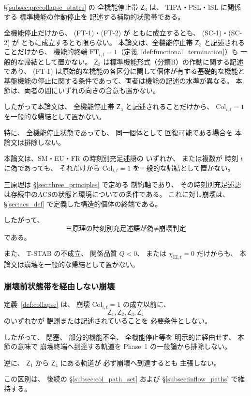 \begin{remark}[全機能停止と崩壊の区別]
\label{rem:full_stop_not_collapse}
\S\ref{subsec:precollapse_states} の
全機能停止帯
$\mathsf{Z}_3$
は、
TIPA・PSL・ISL に関係する
標準機能の作動停止を
記述する補助的状態帯である。

全機能停止だけから、
(FT-1)・(FT-2) が
ともに成立するとも、
(SC-1)・(SC-2) が
ともに成立するとも限らない。
本論文は、全機能停止帯 $\mathsf{Z}_3$ と記述されることだけから、
機能的終端 $\mathrm{FT}_{i,t}=1$（定義~\ref{def:functional_termination}）も
一般的な帰結として置かない。
$\mathsf{Z}_3$ は標準機能形式（分類B）の作動に関する記述であり、
(FT-1) は原始的な機能の各区分に関して個体が有する基礎的な機能と
基盤機能の停止に関する条件であって、両者は機能の記述の水準が異なる。
本節は、両者の間にいずれの向きの含意も置かない。

したがって本論文は、
全機能停止帯 $\mathsf{Z}_3$ と記述されることだけから、
$\mathrm{Col}_{i,t}=1$ を一般的な帰結として置かない。

特に、
全機能停止状態であっても、
同一個体として
回復可能である場合を
本論文は排除しない。
\end{remark}

\begin{remark}[三原理の時刻別充足述語が偽であることと崩壊の関係]
\label{rem:principle_failure_not_collapse}
本論文は、SM・EU・FR の時刻別充足述語の
いずれか、
または複数が
時刻 $t$ に偽であっても、
それだけから
$\mathrm{Col}_{i,t}=1$
を一般的な帰結として置かない。

三原理は
\S\ref{sec:three_principles} で定める
制約軸であり、
その時刻別充足述語は存続中のACSの状態と環境についての条件である。
これに対し崩壊は、
\S\ref{sec:acs_def} で定義した構造的個体の終端である。

したがって、
\[
  \text{三原理の時刻別充足述語が偽}
  \neq
  \text{崩壊判定}
\]
である。

また、
T-STAB の不成立、
関係品質 $Q<0$、
または
$\chi_{\mathrm{EI},t}=0$
だけからも、
本論文は崩壊を一般的な帰結として置かない。
\end{remark}

\subsubsection{崩壊前状態帯を経由しない崩壊}

\begin{remark}[崩壊前状態帯の事前経由を必要条件としない]
\label{rem:collapse_without_precollapse}
定義~\ref{def:collapse} は、
崩壊
$\mathrm{Col}_{i,t}=1$
の成立以前に、
\[
  \mathsf{Z}_1,
  \mathsf{Z}_2,
  \mathsf{Z}_3,
  \mathsf{Z}_4
\]
のいずれかが
観測または記述されていることを
必要条件としない。

したがって、
閉塞、
部分的機能不全、
全機能停止等を
明示的に経由せず、
本節の意味で
崩壊終端へ到達する軌道を
Phase~1 の一般論から排除しない。

逆に、
$\mathsf{Z}_1$ から
$\mathsf{Z}_4$
にある軌道が
必ず崩壊へ到達するとも
主張しない。

この区別は、
後続の
\S\ref{subsec:col_path_set}
および
\S\ref{subsec:inflow_paths}
で維持する。
\end{remark}

